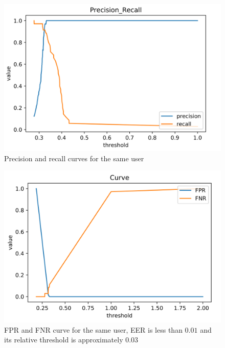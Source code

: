 \documentclass[8pt,notitlepage]{report}
\begin{document}
			\begin{figure}[H]
				\begin{center}
					\includegraphics[scale=.35]{precision_recall_FDTW_Giovanni}
					\caption{Precision and recall curves for the same user}
				\end{center}
			\end{figure}
			
			\begin{figure}[H]
				\begin{center}
					\includegraphics[scale=.35]{fpr_fnr_FDTW_Giovanni}
					\caption{FPR and FNR curve for the same user, EER is less than $ 0.01 $ and its relative threshold is approximately $ 0.03 $ }
				\end{center}
			\end{figure}
			
\end{document}
